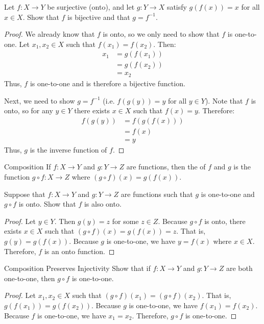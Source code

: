 \documentclass[letterpaper,12pt]{report}
\begin{document}
\begin{exbox}{}{}
	Let $f : X \to Y$ be surjective (onto), and let $g : Y \to X$ satisfy $g(f(x)) = x$ for all $x \in X$. Show that $f$ is bijective and that $g = f^{-1}$.
	\tcblower
	\begin{proof}
		We already know that $f$ is onto, so we only need to show that $f$ is one-to-one. Let $x_1, x_2 \in X$ such that $f(x_1) = f(x_2)$. Then:
		\begin{align*}
			x_1 &= g(f(x_1)) \\
			&= g(f(x_2)) \\
			&= x_2
		\end{align*}
		Thus, $f$ is one-to-one and is therefore a bijective function.

		Next, we need to show $g = f^{-1}$ (i.e. $f(g(y)) = y$ for all $y \in Y$). Note that $f$ is onto, so for any $y \in Y$ there exists $x \in X$ such that $f(x) = y$. Therefore:
		\begin{align*}
			f(g(y)) &= f(g(f(x))) \\
			&= f(x) \\
			&= y
		\end{align*}
		Thus, $g$ is the inverse function of $f$.
	\end{proof}
\end{exbox}

\begin{dfnbox}{Composition}{}
	If $f : X \to Y$ and $g : Y \to Z$ are functions, then the  of $f$ and $g$ is the function $g \circ f : X \to Z$ where $(g \circ f) (x) = g(f(x))$.
\end{dfnbox}

\begin{exbox}{}{}
    Suppose that $f : X \to Y$ and $g : Y \to Z$ are functions such that $g$ is one-to-one and $g \circ f$ is onto. Show that $f$ is also onto.
    \tcblower
    \begin{proof}
        Let $y \in Y$. Then $g(y) = z$ for some $z \in Z$. Because $g \circ f$ is onto, there exists $x \in X$ such that $(g \circ f)(x) = g(f(x)) = z$. That is, $g(y) = g(f(x))$. Because $g$ is one-to-one, we have $y = f(x)$ where $x \in X$. Therefore, $f$ is an onto function.
    \end{proof}
\end{exbox}

\begin{exbox}{Composition Preserves Injectivity}{}
    Show that if $f : X \to Y$ and $g : Y \to Z$ are both one-to-one, then $g \circ f$ is one-to-one.
    \tcblower
    \begin{proof}
        Let $x_1, x_2 \in X$ such that $(g \circ f)(x_1) = (g \circ f)(x_2)$. That is, $g(f(x_1)) = g(f(x_2))$. Because $g$ is one-to-one, we have $f(x_1) = f(x_2)$. Because $f$ is one-to-one, we have $x_1 = x_2$. Therefore, $g \circ f$ is one-to-one.
    \end{proof}
\end{exbox}
\end{document}

